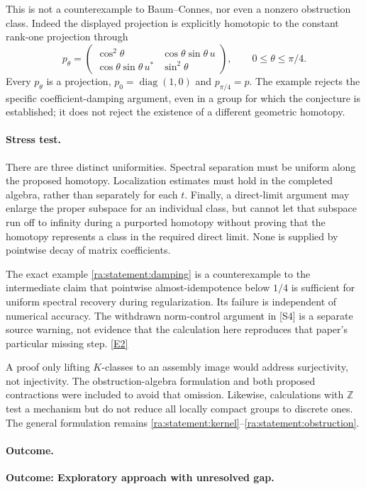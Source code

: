 \documentclass[11pt]{article}
\newcommand{\Z}{\mathbb{Z}}
\newcommand{\eref}[2]{\hyperlink{extra:#1:#2}{[E#2]}}
\begin{document}
This is not a counterexample to Baum--Connes, nor even a nonzero
obstruction class. Indeed the displayed projection is explicitly
homotopic to the constant rank-one projection through
\[
 p_\theta=
 \begin{pmatrix}
 \cos^2\theta&\cos\theta\sin\theta\,u\\
 \cos\theta\sin\theta\,u^*&\sin^2\theta
 \end{pmatrix},\qquad 0\le\theta\le\pi/4.
\]
Every $p_\theta$ is a projection, $p_0=\operatorname{diag}(1,0)$ and
$p_{\pi/4}=p$. The example rejects the specific coefficient-damping
argument, even in a group for which the conjecture is established; it
does not reject the existence of a different geometric homotopy.

\paragraph{Stress test.}
There are three distinct uniformities. Spectral separation must be
uniform along the proposed homotopy. Localization estimates must hold
in the completed algebra, rather than separately for each $t$. Finally,
a direct-limit argument may enlarge the proper subspace for an individual
class, but cannot let that subspace run off to infinity during a purported
homotopy without proving that the homotopy represents a class in the
required direct limit. None is supplied by pointwise decay of matrix
coefficients.

The exact example \eqref{ra:statement:damping} is a counterexample to the
intermediate claim that pointwise almost-idempotence below $1/4$ is
sufficient for uniform spectral recovery during regularization. Its
failure is independent of numerical accuracy. The withdrawn norm-control
argument in [S4] is a separate source warning, not evidence that the
calculation here reproduces that paper's particular missing step.
\eref{statement}{2}

A proof only lifting $K$-classes to an assembly image would address
surjectivity, not injectivity. The obstruction-algebra formulation and
both proposed contractions were included to avoid that omission.
Likewise, calculations with $\Z$ test a mechanism but do not reduce all
locally compact groups to discrete ones. The general formulation remains
\eqref{ra:statement:kernel}--\eqref{ra:statement:obstruction}.

\paragraph{Outcome.}
\textbf{Outcome: Exploratory approach with unresolved gap.}
\end{document}
